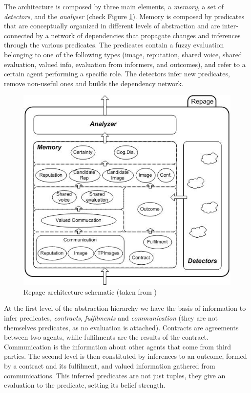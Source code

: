 The architecture is composed by three main elements, a \textit{memory}, a set of \textit{detectors}, and the \textit{analyser} (check Figure \ref{fig:Repage}). Memory is composed by predicates that are conceptually organized in different levels of abstraction and are inter-connected by a network of dependencies that propagate changes and inferences through the various predicates. The predicates contain a fuzzy evaluation belonging to one of the following types (image, reputation, shared voice, shared evaluation, valued info, evaluation from informers, and outcomes), and refer to a certain agent performing a specific role. The detectors infer new predicates, remove non-useful ones and builds the dependency network.

\begin{figure}[hbt]
	\centering
	\includegraphics[width=\textwidth]{figures/repage.jpg}
	\caption{Repage architecture schematic (taken from \cite{Sabater2006})}
	\label{fig:Repage}
\end{figure}

At the first level of the abstraction hierarchy we have the basis of information to infer predicates, \textit{contracts}, \textit{fulfilments} and \textit{communication} (they are not themselves predicates, as no evaluation is attached). Contracts are agreements between two agents, while fulfilments are the results of the contract. Communication is the information about other agents that come from third parties. The second level is then constituted by inferences to an outcome, formed by a contract and its fulfilment, and valued information gathered from communications. This inferred predicates are not just tuples, they give an evaluation to the predicate, setting its belief strength. 

